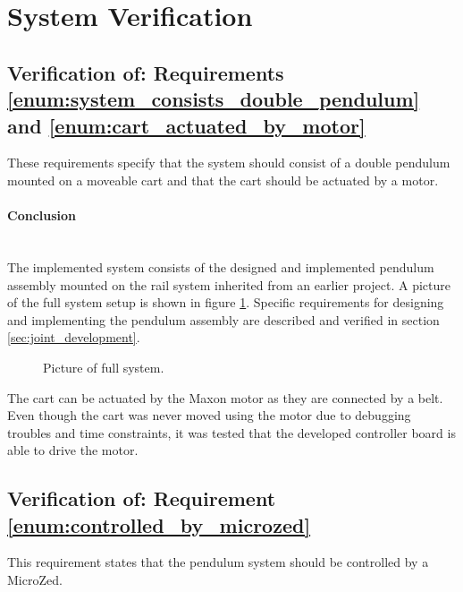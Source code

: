 \section{System Verification}
\label{sec:system_verification}
\subsection{Verification of: Requirements \ref{enum:system_consists_double_pendulum} and \ref{enum:cart_actuated_by_motor}} %
\label{sub:verification_of_requirement_enum:system_consists_double_pendulum}
These requirements specify that the system should consist of a double pendulum mounted on a moveable cart and that the cart should be actuated by a motor.

\paragraph{Conclusion}~\\
The implemented system consists of the designed and implemented pendulum assembly mounted on the rail system inherited from an earlier project.
A picture of the full system setup is shown in figure \ref{fig:pic_full_system}.
Specific requirements for designing and implementing the pendulum assembly are described and verified in section \ref{sec:joint_development}.
\begin{figure}
	\centering
	\caption{Picture of full system.}
	\label{fig:pic_full_system}
\end{figure}
The cart can be actuated by the Maxon motor as they are connected by a belt. 
Even though the cart was never moved using the motor due to debugging troubles and time constraints, it was tested that the developed controller board is able to drive the motor.

\subsection{Verification of: Requirement \ref{enum:controlled_by_microzed}} %
\label{sub:verification_of_requirement_enum:controlled_by_microzed}
This requirement states that the pendulum system should be controlled by a MicroZed.

